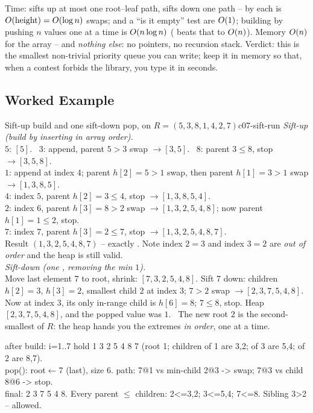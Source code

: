 \begin{complexitybox}
Time:  sifts up at most one root--leaf path,  sifts down one path -- by
 each is $O(\operatorname{height})=O(\log n)$ swaps;  and a ``is it empty'' test are
$O(1)$; building by pushing $n$ values one at a time is $O(n\log n)$ ( beats
that to $O(n)$). Memory $O(n)$ for the array -- and \emph{nothing else}: no pointers, no recursion
stack. Verdict: this is the smallest non-trivial priority queue you can write; keep it in memory so that,
when a contest forbids the library, you type it in seconds.
\end{complexitybox}

\subsection{Worked Example}

\begin{example}{Sift-up build and one sift-down pop, on $R=(5,3,8,1,4,2,7)$}{c07-sift-run}
\emph{Sift-up (build by inserting in array order).}\\
$5$: $[5]$. \ $3$: append, parent $5>3$ swap $\to[3,5]$. \ $8$: parent $3\le8$, stop $\to[3,5,8]$.\\
$1$: append at index $4$; parent $h[2]{=}5>1$ swap, then parent $h[1]{=}3>1$ swap $\to[1,3,8,5]$.\\
$4$: index $5$, parent $h[2]{=}3\le4$, stop $\to[1,3,8,5,4]$.\\
$2$: index $6$, parent $h[3]{=}8>2$ swap $\to[1,3,2,5,4,8]$; now parent $h[1]{=}1\le2$, stop.\\
$7$: index $7$, parent $h[3]{=}2\le7$, stop $\to[1,3,2,5,4,8,7]$.\\
Result $(1,3,2,5,4,8,7)$ -- exactly . Note index $2{=}3$ and index $3{=}2$ are
\emph{out of order} and the heap is still valid.\\[2pt]
\emph{Sift-down (one , removing the min $1$).}\\
Move last element $7$ to root, shrink: $[7,3,2,5,4,8]$. Sift $7$ down: children $h[2]{=}3$, $h[3]{=}2$,
smallest child $2$ at index $3$; $7>2$ swap $\to[2,3,7,5,4,8]$. Now at index $3$, its only in-range child
is $h[6]{=}8$; $7\le8$, stop. Heap $[2,3,7,5,4,8]$, and the popped value was $1$. \checkmark\ The new root
$2$ is the second-smallest of $R$: the heap hands you the extremes \emph{in order}, one  at a
time.
\end{example}
\begin{tracebox}
after build: i=1..7 hold 1 3 2 5 4 8 7 (root 1; children of 1 are 3,2; of 3 are 5,4; of 2 are 8,7).\\
pop(): root$\leftarrow$7 (last), size 6. path: 7@1 vs min-child 2@3 -> swap; 7@3 vs child 8@6 -> stop.\\
final: 2 3 7 5 4 8. Every parent $\le$ children: 2<=3,2; 3<=5,4; 7<=8. Sibling 3>2 -- allowed.
\end{tracebox}


